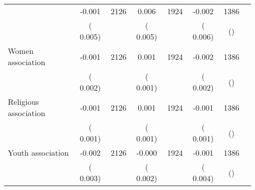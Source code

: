 \begin{tabular}{l*{6}{c}}
        &             -0.001      &       2126       &              0.006      &       1924       &             -0.002      &       1386  &  &              \\
                       &       (       0.005)            &                               &       (       0.005)            &                               &       (       0.006)            &       () &                  \\
Women association        &             -0.001      &       2126       &              0.001      &       1924       &             -0.002      &       1386  &  &              \\
                       &       (       0.002)            &                               &       (       0.001)            &                               &       (       0.002)            &       () &                  \\
Religious association        &             -0.001      &       2126       &              0.001      &       1924       &             -0.001      &       1386  &  &              \\
                       &       (       0.001)            &                               &       (       0.001)            &                               &       (       0.001)            &       () &                  \\
Youth association        &             -0.002      &       2126       &             -0.000      &       1924       &             -0.001      &       1386  &  &              \\
                       &       (       0.003)            &                               &       (       0.002)            &                               &       (       0.004)            &       () &                  \\
\hline \end{tabular}
